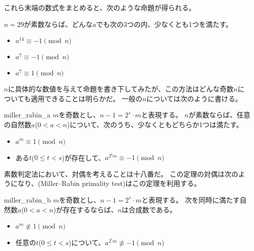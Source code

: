 これら末端の数式をまとめると、次のような命題が得られる。
\begin{Prop}{}{}
$n=29$が素数ならば、どんな$a$でも次の3つの内、少なくとも1つを満たす。
\begin{itemize}
\item $a^{14} \equiv -1 \pmod{n}$
\item $a^{7} \equiv -1 \pmod{n}$
\item $a^{7} \equiv 1 \pmod{n}$
\end{itemize}
\end{Prop}

$n$に具体的な数値を与えて命題を書き下してみたが、この方法はどんな奇数$n$についても適用できることは明らかだ。
一般の$n$については次のように書ける。

\begin{Theo}{}{miller_rabin_a}
$m$を奇数とし、$n-1 = 2^s \cdot m$と表現する。
$n$が素数ならば、任意の自然数$a$($0<a<n$)について、次のうち、少なくともどちらか1つは満たす。
\begin{itemize}
\item $a^m \equiv 1 \pmod{n}$
\item ある$t$($0\le t<s$)が存在して、$a^{2^tm} \equiv -1 \pmod{n}$
\end{itemize}
\end{Theo}

素数判定法において、対偶を考えることは十八番だ。
この定理の対偶は次のようになり、(Miller–Rabin primality test)はこの定理を利用する。

\begin{Theo}{}{miller_rabin_b}
$m$を奇数とし、$n-1 = 2^s \cdot m$と表現する。
次を同時に満たす自然数$a$($0<a<n$)が存在するならば、$n$は合成数である。
\begin{itemize}
\item $a^m \not\equiv 1 \pmod{n}$
\item 任意の$t$($0\le t<s$)について、$a^{2^tm} \not\equiv -1 \pmod{n}$
\end{itemize}
\end{Theo}


